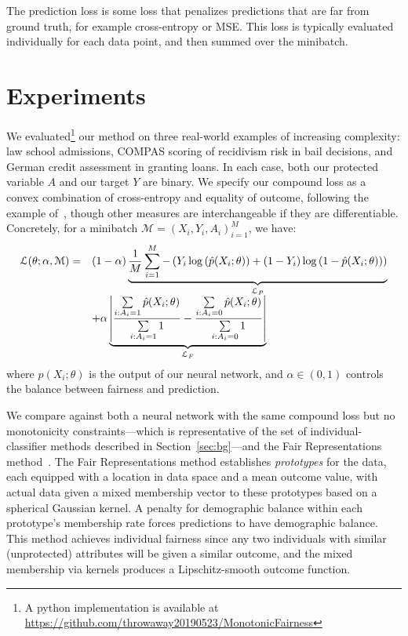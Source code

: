     The prediction loss is some loss that penalizes predictions that are far from ground truth, for example cross-entropy or MSE. This loss is typically evaluated individually for each data point, and then summed over the minibatch.

\section{Experiments}
    
    We evaluated\footnote{A python implementation is available at\\ \href{https://github.com/throwaway20190523/MonotonicFairness}{https://github.com/throwaway20190523/MonotonicFairness}} our method on three real-world examples of increasing complexity: law school admissions, COMPAS scoring of recidivism risk in bail decisions, and German credit assessment in granting loans.  In each case, both our protected variable $A$ and our target $Y$ are binary. We specify our compound loss as a convex combination of cross-entropy and equality of outcome, following the example of~\cite{ZemQiSwePitDwo2013}, though other measures are interchangeable if they are differentiable. Concretely, for a minibatch  $\mathcal{M} = (X_i, Y_i, A_i)_{i=1}^M$, we have:
    \begin{equation}
        \begin{array}{l l}
            \mathcal{L}(\theta;\alpha, \mathcal{M}) =
            & (1 - \alpha) \underbrace{\frac{1}{M}
                \sum_{i=1}^M -\left(Y_i \log\left(\hat{p}(X_i; \theta)\right) + (1 - Y_i) \log\left(1 - \hat{p}(X_i; \theta) \right)\right)
            }_{\mathcal{L}_P} \\  
            & + \alpha \underbrace{
                    \left| 
                        \frac{\sum\limits_{i: A_i = 1} \hat{p}(X_i; \theta)}{\sum\limits_{i: A_i = 1} 1}
                        -
                        \frac{\sum\limits_{i: A_i = 0} \hat{p}(X_i; \theta)}{\sum\limits_{i: A_i = 0} 1}
                    \right|
            }_{\mathcal{L}_F} \nonumber
        \end{array} \label{eqn:experiment_loss}
    \end{equation}
    where $\hat{p}(X_i; \theta)$ is the output of our neural network, and $\alpha\in (0,1)$ controls the balance between fairness and prediction.
    
    We compare against both a neural network with the same compound loss but no monotonicity constraints---which is representative of the set of individual-classifier methods described in Section~\ref{sec:bg}---and the Fair Representations method~\cite{ZemQiSwePitDwo2013}. The Fair Representations method establishes \textit{prototypes} for the data, each equipped with a location in data space and a mean outcome value, with actual data given a mixed membership vector to these prototypes based on a spherical Gaussian kernel. A penalty for demographic balance within each prototype's membership rate forces predictions to have demographic balance. This method achieves individual fairness since any two individuals with similar (unprotected) attributes will be given a similar outcome, and the mixed membership via kernels produces a Lipschitz-smooth outcome function.

